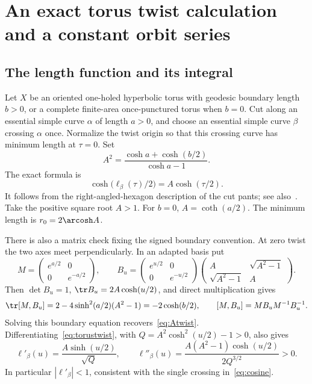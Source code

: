 \section{An exact torus twist calculation and a constant orbit series}
\label{sec:exacttwist}

\subsection{The length function and its integral}

Let $X$ be an oriented one-holed hyperbolic torus with geodesic boundary
length $b>0$, or a complete finite-area once-punctured torus when $b=0$.
Cut along an essential simple curve $\alpha$ of length $a>0$, and choose
an essential simple curve $\beta$ crossing $\alpha$ once.
Normalize the twist origin so that this crossing curve
has minimum length at $\tau=0$. Set
\begin{equation}
 A^2=\frac{\cosh a+\cosh(b/2)}{\cosh a-1}.
 \label{eq:Atwist}
\end{equation}
The exact formula is
\begin{equation}
 \boxed{\cosh\bigl(\ell_\beta(\tau)/2\bigr)=A\cosh(\tau/2).}
 \label{eq:torustwist}
\end{equation}
It follows from the right-angled-hexagon description of the cut pants;
see also~\cite[Proposition 3.1, pp.~5--6]{ALPS}. Take the positive square
root $A>1$. For $b=0$,
$A=\coth(a/2)$. The minimum length is $r_0=2\arcosh A$.

There is also a matrix check fixing the signed boundary convention.
At zero twist the two axes meet perpendicularly. In an adapted basis put
\[
 M=\begin{pmatrix}e^{a/2}&0\\0&e^{-a/2}\end{pmatrix},\qquad
 B_u=\begin{pmatrix}e^{u/2}&0\\0&e^{-u/2}\end{pmatrix}
      \begin{pmatrix}A&\sqrt{A^2-1}\\\sqrt{A^2-1}&A\end{pmatrix}.
\]
Then $\det B_u=1$, $\tr B_u=2A\cosh(u/2)$, and direct multiplication gives
\[
 \tr[M,B_u]=2-4\sinh^2(a/2)(A^2-1)=-2\cosh(b/2),
 \qquad [M,B_u]=MB_uM^{-1}B_u^{-1}.
\]
Solving this boundary equation recovers~\eqref{eq:Atwist}.
Differentiating~\eqref{eq:torustwist}, with
$Q=A^2\cosh^2(u/2)-1>0$, also gives
\begin{equation}
 \ell'_\beta(u)=\frac{A\sinh(u/2)}{\sqrt Q},\qquad
 \ell''_\beta(u)=\frac{A(A^2-1)\cosh(u/2)}{2Q^{3/2}}>0.
 \label{eq:torustwistderivatives}
\end{equation}
In particular $|\ell'_\beta|<1$, consistent with the single crossing
in~\eqref{eq:cosine}.


